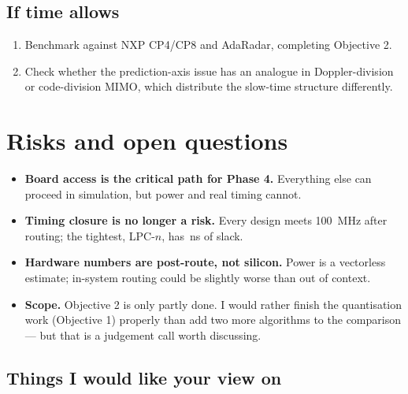\documentclass[11pt,a4paper]{article}
\begin{document}
\subsection{If time allows}

\begin{enumerate}[resume]
\item Benchmark against NXP CP4/CP8 and AdaRadar, completing Objective 2.
\item Check whether the prediction-axis issue has an analogue in
Doppler-division or code-division MIMO, which distribute the slow-time
structure differently.
\end{enumerate}

\section{Risks and open questions}

\begin{itemize}
\item \textbf{Board access is the critical path for Phase 4.} Everything else
can proceed in simulation, but power and real timing cannot.

\item \textbf{Timing closure is no longer a risk.} Every design meets
\SI{100}{\mega\hertz} after routing; the tightest, LPC-$n$, has
\,ns of slack.

\item \textbf{Hardware numbers are post-route, not silicon.} Power is a
vectorless estimate; in-system routing could be slightly worse than out of
context.

\item \textbf{Scope.} Objective 2 is only partly done. I would rather finish
the quantisation work (Objective 1) properly than add two more algorithms to
the comparison --- but that is a judgement call worth discussing.
\end{itemize}

\subsection*{Things I would like your view on}
\end{document}
